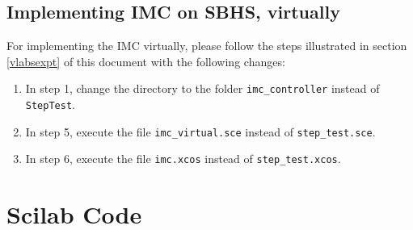 \subsection{Implementing IMC on SBHS, virtually}
For implementing the IMC virtually, please follow the steps illustrated in 
section \ref{vlabsexpt} of this document with the following changes:
\begin{enumerate}

\item In step 1, change the directory to the folder {\tt imc\_controller} instead of {\tt StepTest}.
\item In step 5, execute the file {\tt imc\_virtual.sce} instead of {\tt step\_test.sce}.
\item In step 6, execute the file {\tt imc.xcos} instead of {\tt step\_test.xcos}.

\end{enumerate}


\section{Scilab Code}\label{imccodes}
\begin{code}

\end{code}

\begin{code}

\end{code}


\begin{code}

\end{code}


\begin{code}

\end{code}


% 
